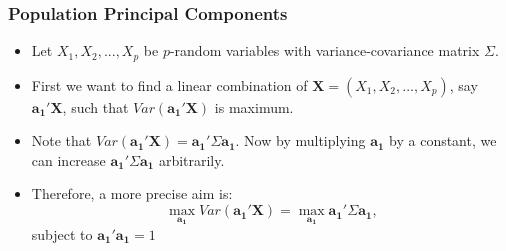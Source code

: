 \documentclass[10pt]{beamer} %
\begin{document}
\begin{frame}
   \frametitle{Population Principal Components}
   \begin{itemize}
      \item Let $X_1,X_2,...,X_p$ be $p$-random variables with variance-covariance matrix $\Sigma$.
         \vspace{0.25cm}	
      \item First we want to find a linear combination of
         $\boldsymbol{X}=(X_1,X_2,...,X_p)$, say
         $\boldsymbol{a_{1}'}\boldsymbol{X}$, such that
         $Var(\boldsymbol{a_{1}'}\boldsymbol{X})$ is maximum.
         \vspace{0.25cm}		
      \item Note that
         $Var(\boldsymbol{a_{1}'}\boldsymbol{X})=\boldsymbol{a_{1}'}\Sigma\boldsymbol{a_1}$.
         Now by multiplying $\boldsymbol{a_1}$ by a constant, we can increase
         $\boldsymbol{a_{1}'}\Sigma\boldsymbol{a_1}$ arbitrarily.
         \vspace{0.25cm}
      \item Therefore, a more precise aim is:
         \begin{equation*}
            \operatorname*{max}_{\boldsymbol{a_1}}
            Var(\boldsymbol{a_{1}'}\boldsymbol{X})=\operatorname*{max}_{\boldsymbol{a_1}}
            \boldsymbol{a_{1}'}\Sigma\boldsymbol{a_1},
         \end{equation*}
         subject to $\boldsymbol{a_{1}'}\boldsymbol{a_{1}}=1$
   \end{itemize}	
\end{frame}
\end{document}
